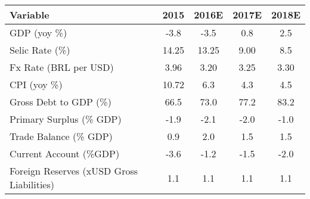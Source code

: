 \documentclass[article,crop=false]{standalone}%
\begin{document}
%
\normalsize%
\setlength{\tabcolsep}{0.2cm}%
\begin{tabular}{l c c c c}%
\hline%
\textbf{Variable}&\textbf{2015}&\textbf{2016E}&\textbf{2017E}&\textbf{2018E}\\%
\hline%
\rowcolor{lightgray}%
GDP (yoy \%)&{-}3.8&{-}3.5&0.8&2.5\\%
\rowcolor{white}%
Selic Rate (\%)&14.25&13.25&9.00&8.5\\%
\rowcolor{lightgray}%
Fx Rate (BRL per USD)&3.96&3.20&3.25&3.30\\%
\rowcolor{white}%
CPI (yoy \%)&10.72&6.3&4.3&4.5\\%
\rowcolor{lightgray}%
Gross Debt to GDP (\%)&66.5&73.0&77.2&83.2\\%
\rowcolor{white}%
Primary Surplus (\% GDP)&{-}1.9&{-}2.1&{-}2.0&{-}1.0\\%
\rowcolor{lightgray}%
Trade Balance (\% GDP)&0.9&2.0&1.5&1.5\\%
\rowcolor{white}%
Current Account (\%GDP)&{-}3.6&{-}1.2&{-}1.5&{-}2.0\\%
\rowcolor{lightgray}%
Foreign Reserves (xUSD Gross Liabilities)&1.1&1.1&1.1&1.1\\%
\hline%
\end{tabular}%
\end{document}
